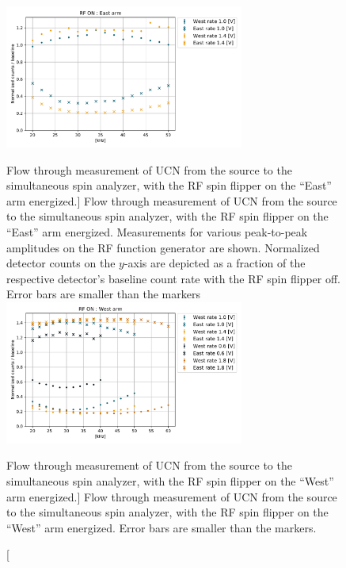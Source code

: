 \begin{figure}
    \centering
    \includegraphics[width=0.7\textwidth]{figures/RF_ON_East_arm.pdf}
    \caption
    [Flow through measurement of UCN from the source to the simultaneous spin analyzer, with the RF spin flipper on the ``East'' arm energized.]
    {Flow through measurement of UCN from the source to the simultaneous spin analyzer, with the RF spin flipper on the ``East'' arm energized. Measurements for various peak-to-peak amplitudes on the RF function generator are shown. Normalized detector counts on the $y$-axis are depicted as a fraction of the respective detector's baseline count rate with the RF spin flipper off. Error bars are smaller than the markers}
    \label{fig:Fall2020_SSA_RF_east}
    \vspace{\baselineskip}
    \centering
    \includegraphics[width=0.7\textwidth]{figures/RF_ON_West_arm.pdf}
    \caption
    [Flow through measurement of UCN from the source to the simultaneous spin analyzer, with the RF spin flipper on the ``West'' arm energized.]
    {Flow through measurement of UCN from the source to the simultaneous spin analyzer, with the RF spin flipper on the ``West'' arm energized. Error bars are smaller than the markers.}\label{fig:Fall2020_SSA_RF_west}
\end{figure}

